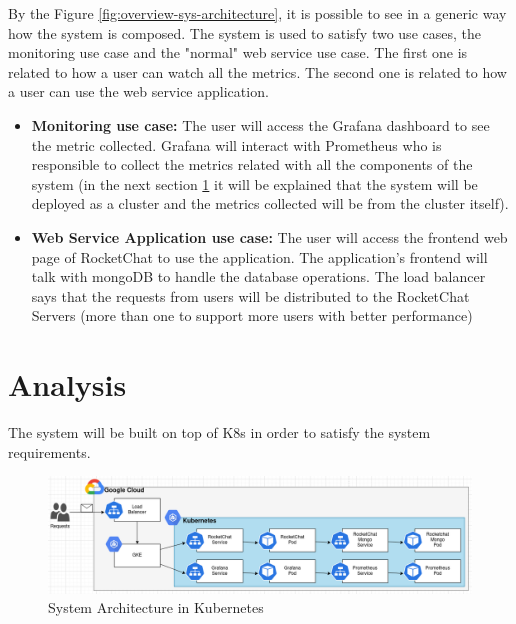 \documentclass[12pt,a4paper,oneside]{report}
\begin{document}
By the Figure \ref{fig:overview-sys-architecture}, it is possible to see in a generic way how the system is composed. The system is used to satisfy two use cases, the monitoring use case and the "normal" web service use case. The first one is related to how a user can watch all the metrics. The second one is related to how a user can use the web service application.

\begin{itemize}
    \item \textbf{Monitoring use case:} The user will access the Grafana dashboard to see the metric collected. Grafana will interact with Prometheus who is responsible to collect the metrics related with all the components of the system (in the next section \ref{section:analysis} it will be explained that the system will be deployed as a cluster and the metrics collected will be from the cluster itself).
    \item \textbf{Web Service Application use case:} The user will access the frontend web page of RocketChat to use the application. The application's frontend will talk with \ac{mongoDB} to handle the database operations. The load balancer says that the requests from users will be distributed to the RocketChat Servers (more than one to support more users with better performance)
\end{itemize}

\section{Analysis}
\label{section:analysis}
The system will be built on top of \ac{K8s} in order to satisfy the system requirements. 

\begin{figure}[htb]
    \centering
    \includegraphics[width=1.0\textwidth]{./pictures/system_architecture_k8s.png}
    \caption{System Architecture in Kubernetes}
    \label{fig:sys-architecture-k8s}
\end{figure}
\end{document}
